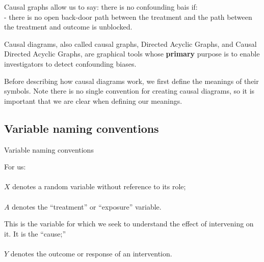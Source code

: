 \documentclass[
  single column]{article}
\makeatletter
\let\oldparagraph\paragraph
\renewcommand{\paragraph}{
    \@ifstar
      \xxxParagraphStar
      \xxxParagraphNoStar
  }
\newcommand{\xxxParagraphStar}[1]{\oldparagraph*{#1}\mbox{}}
\newcommand{\xxxParagraphNoStar}[1]{\oldparagraph{#1}\mbox{}}
\makeatother
\begin{document}
Causal graphs allow us to say: there is no confounding bais if:\\
- there is no open back-door path between the treatment and the path
between the treatment and outcome is unblocked.

Causal diagrams, also called causal graphs, Directed Acyclic Graphs, and
Causal Directed Acyclic Graphs, are graphical tools whose
\textbf{primary} purpose is to enable investigators to detect
confounding biases.

Before describing how causal diagrams work, we first define the meanings
of their symbols. Note there is no single convention for creating causal
diagrams, so it is important that we are clear when defining our
meanings.

\newpage{}

\subsection{Variable naming
conventions}\label{variable-naming-conventions}

\begin{table}

\caption{\label{tbl-terminology}Variable naming conventions}

\centering{

\terminologylocalconventions

}

\end{table}%

For us:

\paragraph{\texorpdfstring{\(X\) denotes a random variable without
reference to its
role;}{X denotes a random variable without reference to its role;}}\label{x-denotes-a-random-variable-without-reference-to-its-role}

\paragraph{\texorpdfstring{\(A\) denotes the ``treatment'' or
``exposure''
variable.}{A denotes the ``treatment'' or ``exposure'' variable.}}\label{a-denotes-the-treatment-or-exposure-variable.}

This is the variable for which we seek to understand the effect of
intervening on it. It is the ``cause;''

\paragraph{\texorpdfstring{\(Y\) denotes the outcome or response of an
intervention.}{Y denotes the outcome or response of an intervention.}}\label{y-denotes-the-outcome-or-response-of-an-intervention.}
\end{document}
